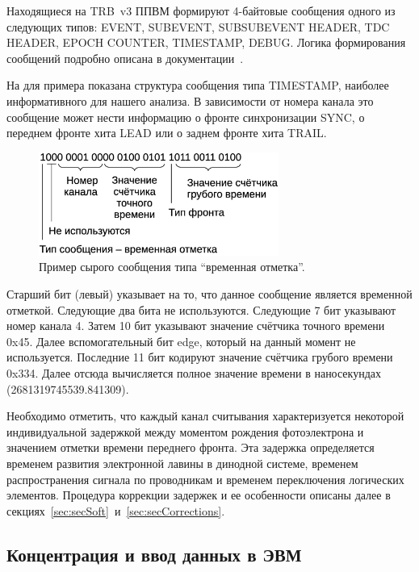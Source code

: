 Находящиеся на TRB~v3 ППВМ формируют 4-байтовые сообщения одного из следующих типов: EVENT, SUBEVENT, SUBSUBEVENT HEADER, TDC HEADER, EPOCH COUNTER, TIMESTAMP, DEBUG. Логика формирования сообщений подробно описана в документации~\cite{TRBDOCU}.

На  для примера показана структура сообщения типа TIMESTAMP, наиболее информативного для нашего анализа. В зависимости от номера канала это сообщение может нести информацию о фронте синхронизации SYNC, о переднем фронте хита LEAD или о заднем фронте хита TRAIL.

\begin{figure}[H]
\centering
\includegraphics[width=0.7\textwidth]{pictures/8_Unpacking.eps}
\caption{Пример сырого сообщения типа ``временная отметка''.}
\label{fig:Unpacking}
\end{figure}

Старший бит (левый) указывает на то, что данное сообщение является временной отметкой. Следующие два бита не используются. Следующие 7 бит указывают номер канала 4. Затем 10 бит указывают значение счётчика точного времени 0x45. Далее вспомогательный бит edge, который на данный момент не используется. Последние 11 бит кодируют значение счётчика грубого времени 0x334. Далее отсюда вычисляется полное значение времени в наносекундах (2681319745539.841309).

Необходимо отметить, что каждый канал считывания характеризуется некоторой индивидуальной задержкой между моментом рождения фотоэлектрона и значением отметки времени переднего фронта. Эта задержка определяется временем развития электронной лавины в динодной системе, временем распространения сигнала по проводникам и временем переключения логических элементов. Процедура коррекции задержек и ее особенности описаны далее в секциях~\ref{sec:secSoft}~и~\ref{sec:secCorrections}.

\subsection{Концентрация и ввод данных в ЭВМ}\label{sec:secFinalReadout}

